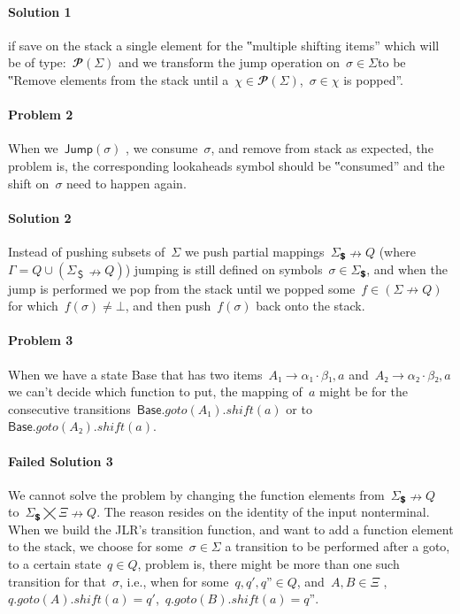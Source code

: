 \paragraph{Solution 1} if save on the stack a single element for the
  ‟multiple shifting items” which will be of type:~$𝓟(Σ)$
  and we transform the jump operation on~$σ∈Σ$to be ‟Remove elements
  from the stack until a~$χ∈𝓟(Σ)$,~$σ∈χ$ is popped”.

\paragraph{Problem 2} When we~$\textsf{Jump}(σ)$ , we consume~$σ$, and remove
  from stack as expected, the problem is, the corresponding lookaheads symbol
  should be ‟consumed” and the shift on~$σ$ need to happen again.

\paragraph{Solution 2} Instead of pushing subsets of~$Σ$ we push partial
  mappings~$Σ_{💲}↛Q$ (where~$Γ=Q∪(Σ_{＄}↛Q)$) jumping is still defined
  on symbols~$σ∈Σ_{💲}$, and when the jump is performed we pop from the stack
  until we popped some~$f∈(Σ↛Q)$ for which~$f(σ)≠⊥$, and then push~$f(σ)$ back onto the stack.

\paragraph{Problem 3} When we have a state \textsf{Base} that has
  two items~$A₁→α₁·β₁,a$ and~$A₂→α₂·β₂,a$ we can't decide which function to put,
  the mapping of~$a$ might be for the consecutive
  transitions~$\textsf{Base}.goto(A₁).shift(a)$ or to~$\textsf{Base}.goto(A₂).shift(a)$.

\paragraph{Failed Solution 3} We cannot solve the problem by changing the function elements from~$Σ_💲↛Q$
  to~$Σ_💲⨉Ξ↛Q$. The reason resides on the identity of the input nonterminal.
  When we build the JLR's transition function, and want to add a function element to the stack, we choose for some~$σ∈Σ$
  a transition to be performed after a goto, to a certain state~$q∈Q$, problem is, there might be more than one such transition
  for that~$σ$, i.e., when for some~$q,q',q”∈Q$, and~$A,B∈Ξ$ ,~$q.goto(A).shift(a)=q'$,~$q.goto(B).shift(a)=q”$.

